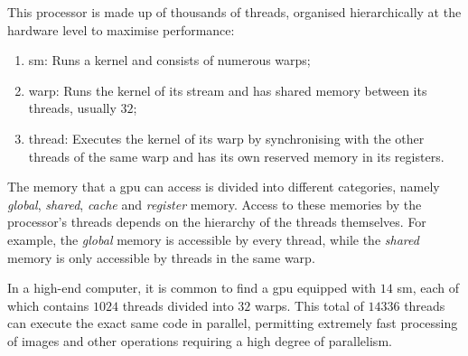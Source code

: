 \noindent This processor is made up of thousands of threads, organised hierarchically at the hardware level to maximise performance:
\begin{enumerate}[label=\roman*.]
\item \gls{sm}: Runs a kernel and consists of numerous \gls{warp}s;
\item \gls{warp}: Runs the kernel of its stream and has shared memory between its threads, usually $32$;
\item \gls{thread}: Executes the kernel of its warp by synchronising with the other \gls{thread}s of the same \gls{warp} and has its own reserved memory in its registers.
\end{enumerate}
\noindent The memory that a \gls{gpu} can access is divided into different categories, namely \textit{global}, \textit{shared}, \textit{cache} and \textit{register} memory. Access to these memories by the processor's \gls{thread}s depends on the hierarchy of the \gls{thread}s themselves. For example, the \textit{global} memory is accessible by every \gls{thread}, while the \textit{shared} memory is only accessible by \gls{thread}s in the same \gls{warp}.

\noindent In a high-end computer, it is common to find a \gls{gpu} equipped with $14$ \gls{sm}, each of which contains $1024$ \gls{thread}s divided into $32$ \gls{warp}s. This total of $14336$ \gls{thread}s can execute the exact same code in parallel, permitting extremely fast processing of images and other operations requiring a high degree of parallelism.

